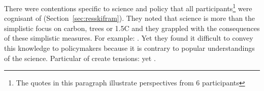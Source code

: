 There were contentions specific to \CAN{} science and policy that all participants\footnote{The quotes in this paragraph illustrate perspectives from 6 participants} were cognisant of (Section~\ref{sec:resskifram}). They noted that \CAN{} science is more than the simplistic focus on carbon, trees or 1.5\degree C and they grappled with the consequences of these simplistic measures. For example: . Yet they found it difficult to convey this knowledge to policymakers because it is contrary to popular understandings of the science. Particular \skifram{} of \CAN{} create tensions:   yet . %
